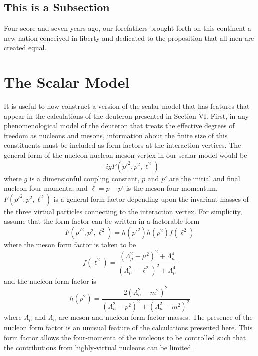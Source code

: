 \documentclass[mythesis.tex]{subfiles}
\begin{document}
\subsection{This is a Subsection}

Four score and seven years ago, our forefathers brought forth on this
continent a new nation conceived in liberty and dedicated to the proposition
that all men are created equal.

\section{The Scalar Model}

It is useful to now construct a version of the scalar model that has
features that appear in the calculations of the deuteron presented
in Section VI. First, in any phenomenological model of the
deuteron that treats the effective degrees of freedom as nucleons and
mesons, information about the finite size of this constituents must be
included as form factors at the interaction vertices. The general form of
the nucleon-nucleon-meson vertex in our scalar model would be
%
\begin{equation}
-i g F(p'^2,p^2,\ell^2) \label{strongvert}
\end{equation}
%
where $g$ is a dimensionful coupling constant, $p$ and $p'$ are the initial
and final nucleon four-momenta, and $\ell=p-p'$ is the meson four-momentum.
$F(p'^2,p^2,\ell^2)$ is a general form factor depending upon the invariant
masses of the three virtual particles connecting to the interaction vertex.
For simplicity, assume that the form factor can be written in a
factorable form \cite{FVOHA,FVOHB,GrossandRiska}
%
\begin{equation}
F(p'^2,p^2,\ell^2)=h(p'^2)h(p^2)f(\ell^2)\label{factorable}
\end{equation}
%
where the meson form factor is taken to be
%
\begin{equation}
f(\ell^2)=\frac{(\Lambda_\mu^2-\mu^2)^2+\Lambda_\mu^4}
{(\Lambda_\mu^2-\ell^2)^2+\Lambda_\mu^4}
\end{equation}
%
and the nucleon form factor is
%
\begin{equation}
h(p^2)=\frac{2(\Lambda_n^2-m^2)^2}{(\Lambda_n^2-p^2)^2+(\Lambda_n^2-m^2)^2}
\end{equation}
%
where $\Lambda_\mu$ and $\Lambda_n$ are meson and nucleon form factor masses.
The presence of the nucleon form factor is an unusual feature of the
calculations presented here. This form factor allows the four-momenta of the
nucleons to be controlled such that the contributions from highly-virtual
nucleons can be limited.
\end{document}
